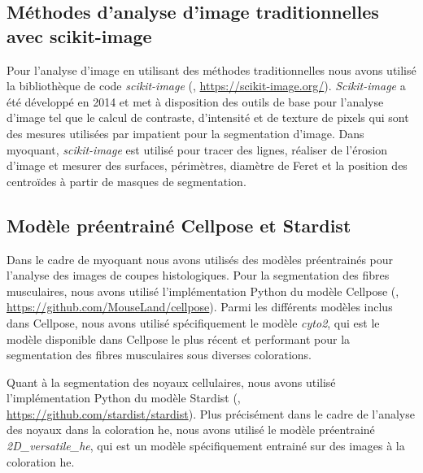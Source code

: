 \subsection{Méthodes d'analyse d'image traditionnelles avec scikit-image}
Pour l'analyse d'image en utilisant des méthodes traditionnelles nous avons utilisé la bibliothèque de code \textit{scikit-image} (\cite{walt_scikit-image_2014}, \href{https://scikit-image.org/}{https://scikit-image.org/}). \textit{Scikit-image} a été développé en 2014 et met à disposition des outils de base pour l'analyse d'image tel que le calcul de contraste, d'intensité et de texture de pixels qui sont des mesures utilisées par \gls{impatient} pour la segmentation d'image. Dans \gls{myoquant}, \textit{scikit-image} est utilisé pour tracer des lignes, réaliser de l'érosion d'image et mesurer des surfaces, périmètres, diamètre de Feret et la position des centroïdes à partir de masques de segmentation.

\subsection{Modèle préentrainé Cellpose et Stardist}
Dans le cadre de \gls{myoquant} nous avons utilisés des modèles préentrainés pour l'analyse des images de coupes histologiques. Pour la segmentation des fibres musculaires, nous avons utilisé l'implémentation Python du modèle Cellpose (\cite{stringer_cellpose_2021}, \href{https://github.com/MouseLand/cellpose}{https://github.com/MouseLand/cellpose}). Parmi les différents modèles inclus dans Cellpose, nous avons utilisé spécifiquement le modèle \textit{cyto2}, qui est le modèle disponible dans Cellpose le plus récent et performant pour la segmentation des fibres musculaires sous diverses colorations. 

Quant à la segmentation des noyaux cellulaires, nous avons utilisé l'implémentation Python du modèle Stardist (\cite{weigert_star-convex_2020}, \href{https://github.com/stardist/stardist}{https://github.com/stardist/stardist}). Plus précisément dans le cadre de l'analyse des noyaux dans la coloration \gls{he}, nous avons utilisé le modèle préentrainé \textit{2D\_versatile\_he}, qui est un modèle spécifiquement entrainé sur des images à la coloration \gls{he}.

